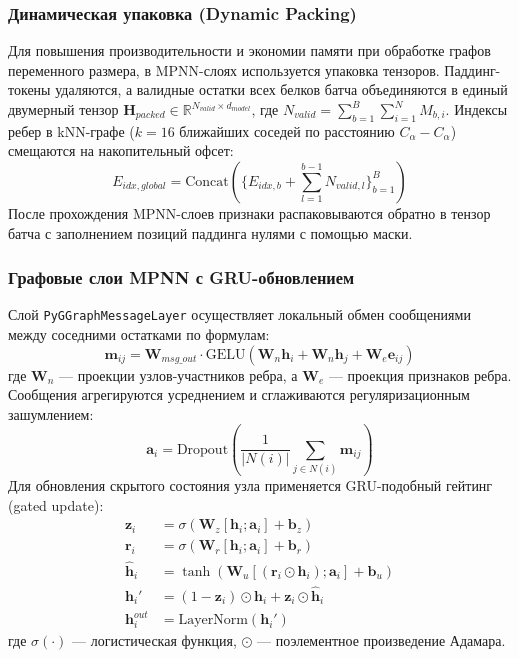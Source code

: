 \documentclass[12pt, a4paper]{article}
\begin{document}
\subsubsection{Динамическая упаковка (Dynamic Packing)}
Для повышения производительности и экономии памяти при обработке графов переменного размера, в MPNN-слоях используется упаковка тензоров. Паддинг-токены удаляются, а валидные остатки всех белков батча объединяются в единый двумерный тензор $\mathbf{H}_{packed} \in \mathbb{R}^{N_{valid} \times d_{model}}$, где $N_{valid} = \sum_{b=1}^{B} \sum_{i=1}^{N} M_{b, i}$. 
Индексы ребер в kNN-графе ($k=16$ ближайших соседей по расстоянию $C_\alpha - C_\alpha$) смещаются на накопительный офсет:
\begin{equation}
    E_{idx, global} = \text{Concat}\left(\{ E_{idx, b} + \sum_{l=1}^{b-1} N_{valid, l} \}_{b=1}^B \right)
\end{equation}
После прохождения MPNN-слоев признаки распаковываются обратно в тензор батча с заполнением позиций паддинга нулями с помощью маски.

\subsubsection{Графовые слои MPNN с GRU-обновлением}
Слой \texttt{PyGGraphMessageLayer} осуществляет локальный обмен сообщениями между соседними остатками по формулам:
\begin{equation}
    \mathbf{m}_{ij} = \mathbf{W}_{msg\_out} \cdot \text{GELU}(\mathbf{W}_{n} \mathbf{h}_i + \mathbf{W}_{n} \mathbf{h}_j + \mathbf{W}_{e} \mathbf{e}_{ij})
\end{equation}
где $\mathbf{W}_{n}$ — проекции узлов-участников ребра, а $\mathbf{W}_{e}$ — проекция признаков ребра. Сообщения агрегируются усреднением и сглаживаются регуляризационным зашумлением:
\begin{equation}
    \mathbf{a}_i = \text{Dropout}\left(\frac{1}{|N(i)|} \sum_{j \in N(i)} \mathbf{m}_{ij}\right)
\end{equation}
Для обновления скрытого состояния узла применяется GRU-подобный гейтинг (gated update):
\begin{align}
    \mathbf{z}_i &= \sigma(\mathbf{W}_z [\mathbf{h}_i; \mathbf{a}_i] + \mathbf{b}_z) \\
    \mathbf{r}_i &= \sigma(\mathbf{W}_r [\mathbf{h}_i; \mathbf{a}_i] + \mathbf{b}_r) \\
    \hat{\mathbf{h}}_i &= \tanh(\mathbf{W}_u [(\mathbf{r}_i \odot \mathbf{h}_i); \mathbf{a}_i] + \mathbf{b}_u) \\
    \mathbf{h}_i' &= (1 - \mathbf{z}_i) \odot \mathbf{h}_i + \mathbf{z}_i \odot \hat{\mathbf{h}}_i \\
    \mathbf{h}_i^{out} &= \text{LayerNorm}(\mathbf{h}_i')
\end{align}
где $\sigma(\cdot)$ — логистическая функция, $\odot$ — поэлементное произведение Адамара.
\end{document}
